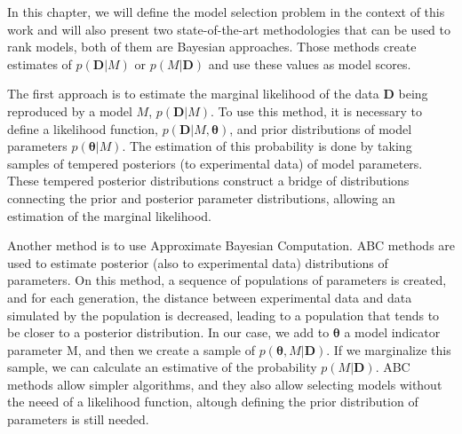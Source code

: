 
In this chapter, we will define the model selection problem in the 
context of this work and will also present two state-of-the-art 
methodologies that can be used to rank models, both of them are Bayesian
approaches. Those methods create estimates of $p ({\bm D} | M)$ or $p
(M | {\bm D})$ and use these values as model scores. 

The first approach is to estimate the marginal likelihood of the data 
${\bm D}$ being reproduced by a model $M$, $p ({\bm D} | M)$. To use
this method, it is necessary to define a likelihood function, $p({\bm D}
| M, {\bm \theta})$, and prior distributions of model parameters $p({\bm
\theta} | M)$. The estimation of this probability is done by taking
samples of tempered posteriors (to experimental data) of model
parameters. These tempered posterior distributions construct a bridge of
distributions connecting the prior and posterior parameter
distributions, allowing an estimation of the marginal likelihood. 

Another method is to use Approximate Bayesian Computation. ABC methods 
are used to estimate posterior (also to experimental data) distributions
of parameters. On this method, a sequence of populations of parameters
is created, and for each generation, the distance between experimental
data and data simulated by the population is decreased, leading to a
population that tends to be closer to a posterior distribution. In our
case, we add to ${\bm \theta}$ a model indicator parameter M, and then
we create a sample of $p({\bm \theta}, M | {\bm D})$. If we marginalize
this sample, we can calculate an estimative of the probability $p (M |
{\bm D})$. ABC methods allow simpler algorithms, and they also allow
selecting models without the neeed of a likelihood function, altough
defining the prior distribution of parameters is still needed.

